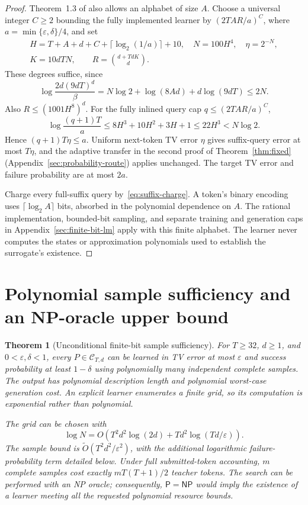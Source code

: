 \documentclass[11pt]{article}
\newcommand{\cC}{\mathcal C}
\newtheorem{theorem}{Theorem}
\theoremstyle{definition}
\theoremstyle{remark}
\begin{document}
\begin{proof}
Theorem~1.3 of \citet{liu-moitra} also allows an alphabet of size $A$. Choose a universal integer $C\ge2$ bounding the fully implemented learner by $(2TAR/a)^C$, where $a=\min\{\varepsilon,\delta\}/4$, and set
\[
\begin{gathered}
H=T+A+d+C+\lceil\log_2(1/a)\rceil+10,\quad
N=100H^4,\quad \eta=2^{-N},\\
K=10dTN,\qquad R=\binom{d+TdK}{d}.
\end{gathered}
\]
These degrees suffice, since
\[
\log\frac{2d(9dT)^d}{\beta}
=N\log2+\log(8Ad)+d\log(9dT)\le2N.
\]
Also $R\le(1001H^8)^d$. For the fully inlined query cap $q\le(2TAR/a)^C$,
\[
\log\frac{(q+1)T}{a}
\le8H^3+10H^2+3H+1
\le22H^3<N\log2.
\]
Hence $(q+1)T\eta\le a$. Uniform next-token TV error $\eta$ gives suffix-query error at most $T\eta$, and the adaptive transfer in the second proof of Theorem~\ref{thm:fixed} (Appendix~\ref{sec:probability-route}) applies unchanged. The target TV error and failure probability are at most $2a$.

Charge every full-suffix query by~\eqref{eq:suffix-charge}. A token's binary encoding uses $\lceil\log_2A\rceil$ bits, absorbed in the polynomial dependence on $A$. The rational implementation, bounded-bit sampling, and separate training and generation caps in Appendix~\ref{sec:finite-bit-lm} apply with this finite alphabet. The learner never computes the states or approximation polynomials used to establish the surrogate's existence.
\end{proof}


\section{Polynomial sample sufficiency and an NP-oracle upper bound}\label{sec:sample-upper}

\begin{theorem}[Unconditional finite-bit sample sufficiency]\label{thm:cover}
For $T\ge32$, $d\ge1$, and $0<\varepsilon,\delta<1$, every $P\in\cC_{T,d}$ can be learned in TV error at most $\varepsilon$ and success probability at least $1-\delta$ using polynomially many independent complete samples. The output has polynomial description length and polynomial worst-case generation cost. An explicit learner enumerates a finite grid, so its computation is exponential rather than polynomial.

The grid can be chosen with
\[
\log N=O\!\left(T^2d^2\log(2d)+Td^2\log(Td/\varepsilon)\right).
\]
The sample bound is $\widetilde O(T^2d^2/\varepsilon^2)$, with the additional logarithmic failure-probability term detailed below. Under full submitted-token accounting, $m$ complete samples cost exactly $mT(T+1)/2$ teacher tokens. The search can be performed with an NP oracle; consequently, $\mathsf P=\mathsf{NP}$ would imply the existence of a learner meeting all the requested polynomial resource bounds.
\end{theorem}
\end{document}
